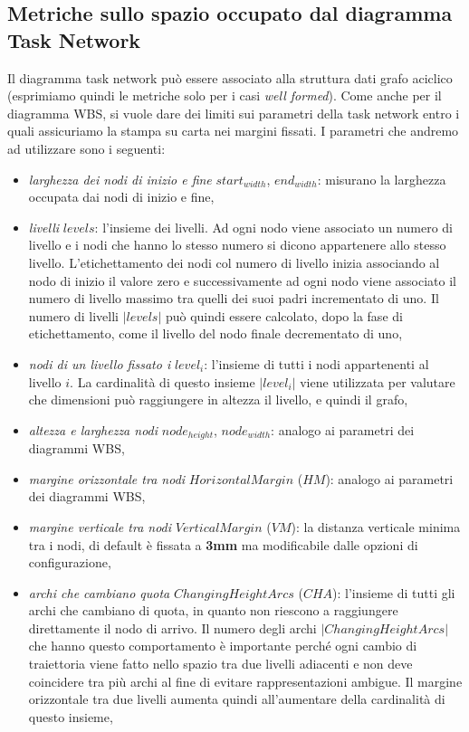 \subsection{Metriche sullo spazio occupato dal diagramma Task Network}
Il diagramma task network pu\`o essere associato alla struttura dati grafo
aciclico (esprimiamo quindi le metriche solo per i casi \emph{well formed}). Come anche per il diagramma WBS, si vuole dare dei limiti sui parametri della task network entro i quali assicuriamo la stampa su carta nei margini fissati. I parametri che andremo ad utilizzare sono i seguenti:
\begin{itemize}
	\item \emph{larghezza dei nodi di inizio e fine} $start_{width}$, $end_{width}$: misurano la larghezza occupata dai nodi di inizio e fine,
	\item \emph{livelli} $levels$: l'insieme dei livelli. Ad ogni nodo viene associato un numero di livello e i nodi che hanno lo stesso numero si dicono appartenere allo stesso livello. L'etichettamento dei nodi col numero di livello inizia associando al nodo di inizio il valore zero e successivamente ad ogni nodo viene associato il numero di livello massimo tra quelli dei suoi padri incrementato di uno. Il numero di livelli $|levels|$ pu\`o quindi essere calcolato, dopo la fase di etichettamento, come il livello del nodo finale decrementato di uno,
	\item \emph{nodi di un livello fissato i} $level_i$:
	l'insieme di tutti i nodi appartenenti al livello $i$. La cardinalit\`a di questo insieme $|level_i|$ viene utilizzata per valutare che dimensioni pu\`o raggiungere in altezza il livello, e quindi il grafo,
	\item \emph{altezza e larghezza nodi} $node_{height}$, $node_{width}$: 
	analogo ai parametri dei diagrammi WBS,
	\item \emph{margine orizzontale tra nodi} $HorizontalMargin$ ($HM$): 
	analogo ai parametri dei diagrammi WBS,
	\item \emph{margine verticale tra nodi} $VerticalMargin$ ($VM$): 
	la distanza verticale minima tra i nodi, di default \`e fissata a \textbf{3mm} ma modificabile dalle opzioni di configurazione,
	\item \emph{archi che cambiano quota} $ChangingHeightArcs$ ($CHA$): 
	l'insieme di tutti gli archi che cambiano di quota, in quanto non riescono a raggiungere direttamente il nodo di arrivo. Il numero degli archi $|ChangingHeightArcs|$ che hanno questo comportamento \`e importante perch\'e ogni cambio di traiettoria viene fatto nello spazio tra due livelli adiacenti e non deve coincidere tra più archi al fine di evitare rappresentazioni ambigue. Il margine orizzontale tra due livelli aumenta quindi all'aumentare della cardinalit\`a di questo insieme,

\end{itemize}
